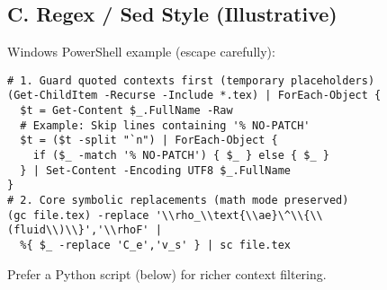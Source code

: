 \documentclass[11pt]{article}
\newcommand{\rhoF}{\rho_{\!f}}                           %
\begin{document}
\subsection*{C. Regex / Sed Style (Illustrative)}
Windows PowerShell example (escape carefully):
\begin{verbatim}
# 1. Guard quoted contexts first (temporary placeholders)
(Get-ChildItem -Recurse -Include *.tex) | ForEach-Object {
  $t = Get-Content $_.FullName -Raw
  # Example: Skip lines containing '% NO-PATCH'
  $t = ($t -split "`n") | ForEach-Object {
    if ($_ -match '% NO-PATCH') { $_ } else { $_ }
  } | Set-Content -Encoding UTF8 $_.FullName
}
# 2. Core symbolic replacements (math mode preserved)
(gc file.tex) -replace '\\rho_\\text{\\ae}\^\\{\\(fluid\\)\\}','\\rhoF' |
  %{ $_ -replace 'C_e','v_s' } | sc file.tex
\end{verbatim}
Prefer a Python script (below) for richer context filtering.
\end{document}
